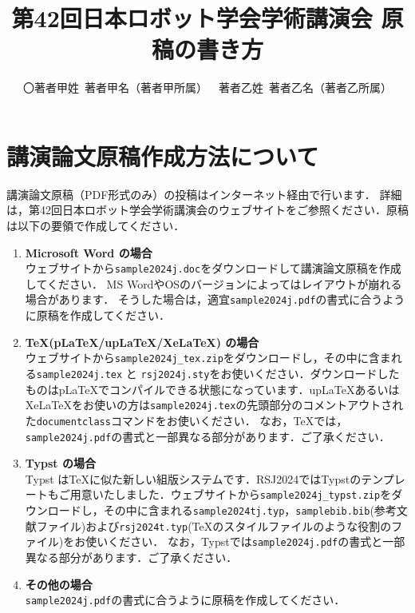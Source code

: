 \documentclass[twocolumn]{jarticle} %
\begin{document}
\title{第42回日本ロボット学会学術講演会 原稿の書き方}
\author{〇著者甲姓\ 著者甲名（著者甲所属）\ \ 著者乙姓\ 著者乙名（著者乙所属）}
\setlength{\baselineskip}{4.4mm}	%
\maketitle
\thispagestyle{empty}
\pagestyle{empty}

\section{講演論文原稿作成方法について}
講演論文原稿（PDF形式のみ）の投稿はインターネット経由で行います．
詳細は，第42回日本ロボット学会学術講演会のウェブサイト\cite{website}をご参照ください．原稿は以下の要領で作成してください．

\begin{enumerate}
    \item {\bfseries Microsoft Word の場合}\\
    ウェブサイト\cite{website}から\verb|sample2024j.doc|をダウンロードして講演論文原稿を作成してください．
    MS WordやOSのバージョンによってはレイアウトが崩れる場合があります．
    そうした場合は，適宜\verb|sample2024j.pdf|の書式に合うように原稿を作成してください．

  \item {\bfseries \TeX (pLaTeX/upLaTeX/XeLaTeX) の場合}\\
    ウェブサイト\cite{website}から\verb|sample2024j_tex.zip|をダウンロードし，その中に含まれる\verb|sample2024j.tex| と \verb|rsj2024j.sty|をお使いください．ダウンロードしたものはpLaTeXでコンパイルできる状態になっています．upLaTeXあるいはXeLaTeXをお使いの方は\verb|sample2024j.tex|の先頭部分のコメントアウトされた\verb|documentclass|コマンドをお使いください．
    なお，\TeX では，\verb|sample2024j.pdf|の書式と一部異なる部分があります．ご了承ください．
  \item {\bfseries Typst の場合}\\
    Typst\cite{typst} は\TeX{}に似た新しい組版システムです．RSJ2024ではTypstのテンプレートもご用意いたしました．ウェブサイト\cite{website}から\verb|sample2024j_typst.zip|をダウンロードし，その中に含まれる\verb|sample2024tj.typ|，\verb|samplebib.bib|(参考文献ファイル)および\verb|rsj2024t.typ|(\TeX{}のスタイルファイルのような役割のファイル)をお使いください．
    なお，Typstでは\verb|sample2024j.pdf|の書式と一部異なる部分があります．ご了承ください．
    \item {\bfseries その他の場合}\\        
    \verb|sample2024j.pdf|の書式に合うように原稿を作成してください．
\end{enumerate}
\end{document}
